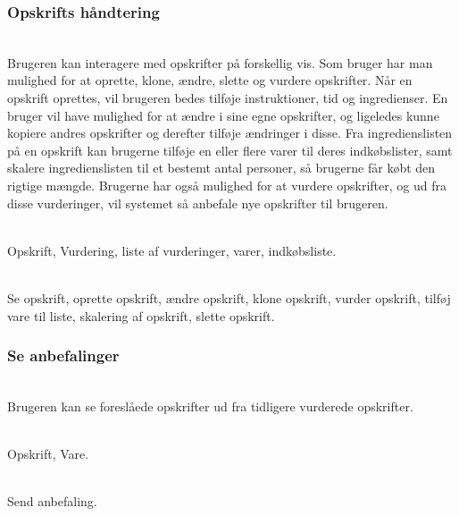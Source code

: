 \subsubsection{Opskrifts håndtering}
\begin{description}[font=\normalfont\itshape]
\item[Brugsmønster]\hfill\\
Brugeren kan interagere med opskrifter på forskellig vis. 
Som bruger har man mulighed for at oprette, klone, ændre, slette og vurdere opskrifter.
Når en opskrift oprettes, vil brugeren bedes tilføje instruktioner, tid og ingredienser.
En bruger vil have mulighed for at ændre i sine egne opskrifter, og ligeledes kunne kopiere andres opskrifter og derefter tilføje ændringer i disse.
Fra ingredienslisten på en opskrift kan brugerne tilføje en eller flere varer til deres indkøbslister, samt skalere ingredienslisten til et bestemt antal personer, så brugerne får købt den rigtige mængde.
Brugerne har også mulighed for at vurdere opskrifter, og ud fra disse vurderinger, vil systemet så anbefale nye opskrifter til brugeren.
\item[Objekter]\hfill\\
Opskrift, Vurdering, liste af vurderinger, varer, indkøbsliste.
\item[Funktioner]\hfill\\
Se opskrift, oprette opskrift, ændre opskrift, klone opskrift, vurder opskrift, tilføj vare til liste, skalering af opskrift, slette opskrift.
\end{description}

\subsubsection*{Se anbefalinger}
\begin{description}[font=\normalfont\itshape]
\item[Brugsmønster]\hfill\\
Brugeren kan se foreslåede opskrifter ud fra tidligere vurderede opskrifter.
\item[Objekter]\hfill\\
Opskrift, Vare.
\item[Funktioner]\hfill\\
Send anbefaling.
\end{description}


